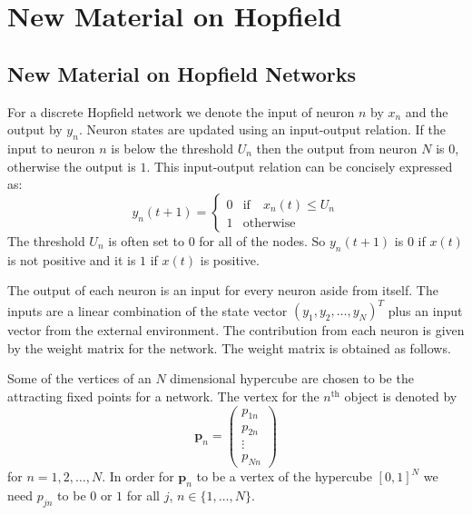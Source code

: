 \chapter{New Material on Hopfield}


\section{New Material on Hopfield Networks}


   For a discrete Hopfield network we denote the input of neuron $n$ by $x_n$ 
and the output by $y_n$.  Neuron states are updated using an input-output 
relation.  If the input to neuron $n$ is below the threshold $U_n$ then the
output from neuron $N$ is $0$, otherwise the output is $1$.  This input-output
relation can be concisely expressed as:
\begin{equation}\label{E:hopIO}
   y_n(t+1) = 
\left\{
\begin{array}{ll}
0 & \mbox{if} \quad x_n(t) \leq U_n   \\
1 & \mathrm{otherwise} 
\end{array}\right.
\end{equation}
The threshold $U_n$ is often set to $0$ for all of the nodes.  So $y_n(t+1)$ is 
$0$ if $x(t)$ is not positive and it is $1$ if $x(t)$ is positive.

   The output of each neuron is an input for every neuron aside from itself.
The inputs are a linear combination of the state vector $(y_1, y_2, \ldots,
y_N)^T$ plus an input vector from the external environment.  The contribution
from each neuron is given by the weight matrix for the network.  The weight
matrix is obtained as follows.

   Some of the vertices of an $N$ dimensional hypercube are chosen to be the 
attracting fixed points for a network.  The vertex for the $n^{\mathrm{th}}$ 
object is denoted by 
\begin{equation*}
\boldsymbol{p}_n =
\begin{pmatrix}
p_{1n} \\ p_{2n} \\ \vdots \\ p_{Nn}
\end{pmatrix}
\end{equation*}
for $n = 1,2, \ldots, N$.  In order for $\boldsymbol{p}_n$ to be a vertex
of the hypercube $[0,1]^N$ we need $p_{jn}$ to be $0$ or $1$ for all $j$, $n 
\in \{1, \ldots, N\}$.

